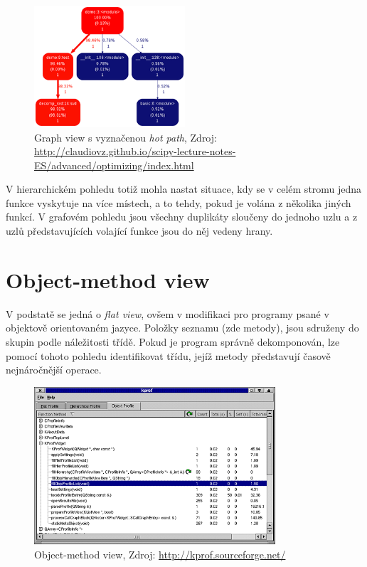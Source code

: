 \documentclass[czech,BP]{thesiskiv}
\begin{document}
\begin{figure}[H]
    \centering
    \includegraphics[interpolate,width=0.5\textwidth]{img/prof_graph.png}
    \caption{Graph view s vyznačenou \emph{hot path}, Zdroj: \url{http://claudiovz.github.io/scipy-lecture-notes-ES/advanced/optimizing/index.html} }
    \label{obr:gview}
\end{figure}

V hierarchickém pohledu totiž mohla nastat situace, kdy se v celém stromu jedna funkce vyskytuje na více místech, a to tehdy, pokud je volána z několika jiných funkcí. V grafovém pohledu jsou všechny duplikáty sloučeny do jednoho uzlu a z uzlů představujících volající funkce jsou do něj vedeny hrany.

\section{Object-method view}

V podstatě se jedná o \emph{flat view}, ovšem v modifikaci pro programy psané v objektově orientovaném jazyce. Položky seznamu (zde metody), jsou sdruženy do skupin podle náležitosti třídě. Pokud je program správně dekomponován, lze pomocí tohoto pohledu identifikovat třídu, jejíž metody představují časově nejnáročnější operace.

\begin{figure}[H]
    \centering
    \includegraphics[interpolate,width=0.8\textwidth]{img/prof_objectview.png}
    \caption{Object-method view, Zdroj: \url{http://kprof.sourceforge.net/} }
    \label{obr:objview}
\end{figure}
\end{document}
